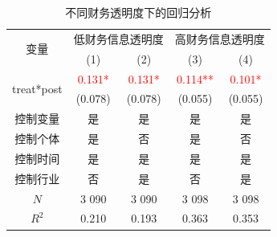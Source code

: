 \documentclass{beamer}	%
\theoremstyle{plain}
\theoremstyle{definition}
\theoremstyle{remark}
\numberwithin{equation}{section}
\begin{document}
\begin{frame}
	\begin{table}[htbp]
		\small
		\centering
		\caption{不同财务透明度下的回归分析}
		\label{不同财务透明度下的回归分析}
		\begin{tabular}{ccccc}
			\toprule
			    \multirow{2}[4]{*}{变量}     &           \multicolumn{2}{c}{低财务信息透明度}            &            \multicolumn{2}{c}{高财务信息透明度}            \\
			        \cmidrule{2-5}         &           (1)           &           (2)           &           (3)            &           (4)           \\ \midrule
			\multirow{2}[1]{*}{treat*post} & \textcolor{red}{0.131*} & \textcolor{red}{0.131*} & \textcolor{red}{0.114**} & \textcolor{red}{0.101*} \\
			                               &         (0.078)         &         (0.078)         &         (0.055)          &         (0.055)         \\
			             控制变量              &            是            &            是            &            是             &            是            \\
			             控制个体              &            是            &            否            &            是             &            否            \\
			             控制时间              &            是            &            是            &            是             &            是            \\
			             控制行业              &            否            &            是            &            否             &            是            \\
			             $N$               &          3 090          &          3 090          &          3 098           &          3 098          \\
			            $R^2$              &          0.210          &          0.193          &          0.363           &          0.353          \\ \bottomrule
		\end{tabular}%
	\end{table}%
\end{frame}
\end{document}
